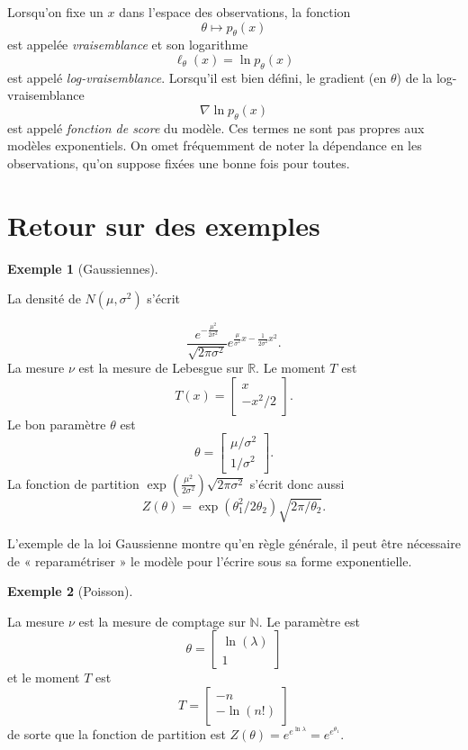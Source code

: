 \documentclass[
  10,
  letterpaper,
  DIV=11,
  numbers=noendperiod]{scrreport}
\theoremstyle{plain}
\theoremstyle{definition}
\theoremstyle{plain}
\theoremstyle{definition}
\theoremstyle{definition}
\newtheorem{example}{Exemple}[chapter]
\theoremstyle{plain}
\theoremstyle{remark}
\begin{document}
Lorsqu'on fixe un \(x\) dans l'espace des observations, la fonction\\
\[ \theta \mapsto p_\theta(x)\] est appelée \emph{vraisemblance} et son
logarithme \[\ell_\theta(x) = \ln p_\theta(x)\] est appelé
\emph{log-vraisemblance}. Lorsqu'il est bien défini, le gradient (en
\(\theta\)) de la log-vraisemblance \[ \nabla \ln p_\theta(x)\] est
appelé \emph{fonction de score} du modèle. Ces termes ne sont pas
propres aux modèles exponentiels. On omet fréquemment de noter la
dépendance en les observations, qu'on suppose fixées une bonne fois pour
toutes.

\hypertarget{retour-sur-des-exemples}{%
\section{Retour sur des exemples}\label{retour-sur-des-exemples}}

\begin{example}[Gaussiennes]\protect\hypertarget{exm-s}{}\label{exm-s}

La densité de \(N(\mu,\sigma^2)\) s'écrit

\[\frac{e^{-\frac{\mu^2}{2\sigma^2}}}{\sqrt{2\pi\sigma^2}}e^{ \frac{\mu}{\sigma^2} x - \frac{1}{2 \sigma^2} x^2 }.\]
La mesure \(\nu\) est la mesure de Lebesgue sur \(\mathbb{R}\). Le
moment \(T\) est \[T(x) = \begin{bmatrix}x \\ -x^2/2 \end{bmatrix} .\]
Le bon paramètre \(\theta\) est
\[ \theta = \begin{bmatrix}\mu/\sigma^2 \\ 1 / \sigma^2\end{bmatrix}.\]
La fonction de partition
\(\exp\left(\frac{\mu^2}{2 \sigma^2} \right)\sqrt{2 \pi \sigma^2}\)
s'écrit donc aussi
\[Z(\theta)=\exp(\theta_1^2 / 2\theta_2)\sqrt{2\pi / \theta_2}. \]

\end{example}

L'exemple de la loi Gaussienne montre qu'en règle générale, il peut être
nécessaire de « reparamétriser » le modèle pour l'écrire sous sa forme
exponentielle.

\begin{example}[Poisson]\protect\hypertarget{exm-ss}{}\label{exm-ss}

La mesure \(\nu\) est la mesure de comptage sur \(\mathbb{N}\). Le
paramètre est
\[ \theta = \begin{bmatrix}\ln(\lambda) \\ 1 \end{bmatrix}\] et le
moment \(T\) est \[ T = \begin{bmatrix}-n \\ - \ln(n!)\end{bmatrix}\] de
sorte que la fonction de partition est
\(Z(\theta) = e^{e^{\ln\lambda}} = e^{e^{\theta_1}}\).

\end{example}
\end{document}
